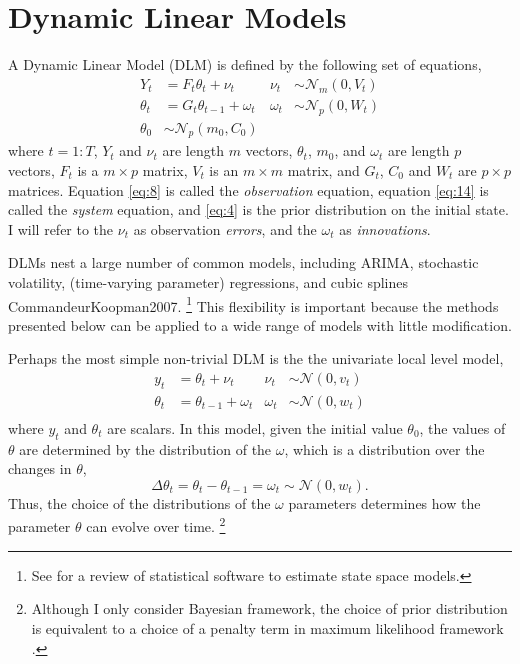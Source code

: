 \documentclass{article}
\newcommand{\paren}[1]{\ensuremath{\left(#1\right)}}
\newcommand{\dnorm}[1]{\ensuremath{\mathcal{N}\paren{#1}}}
\newcommand{\dmvnorm}[2]{\ensuremath{\mathcal{N}_{#2}\paren{#1}}}
\begin{document}
\section{Dynamic Linear Models}

A Dynamic Linear Model (DLM) is defined by the following set of equations,
\begin{align}
  \label{eq:8}
  Y_t &= F_{t} \theta_t + \nu_t & \nu_{t} &\sim \dmvnorm{0, V_{t}}{m} \\
  \label{eq:14}
  \theta_t &= G_{t} \theta_{t-1} + \omega_{t} & \omega_{t} &\sim \dmvnorm{0, W_{t}}{p} \\
  \label{eq:2}
  \theta_{0} & \sim \dmvnorm{m_{0}, C_{0}}{p}
\end{align}  
where $t = 1:T$, 
$Y_{t}$ and $\nu_{t}$ are length $m$ vectors,
$\theta_{t}$, $m_{0}$, and $\omega_{t}$ are length $p$ vectors,
$F_{t}$ is a $m \times p$ matrix, 
$V_{t}$ is an $m \times m$ matrix,
and $G_{t}$, $C_{0}$ and $W_{t}$ are $p \times p$ matrices.
Equation \eqref{eq:8} is called the \textit{observation} equation, 
equation \eqref{eq:14} is called the \textit{system} equation,
and \eqref{eq:4} is the prior distribution on the initial state.
I will refer to the $\nu_{t}$ as observation \textit{errors}, and the $\omega_{t}$ as \textit{innovations}.

DLMs nest a large number of common models, including ARIMA, stochastic volatility, (time-varying parameter) regressions,
and cubic splines \parencites{WestHarrison1997}{DurbinKoopman2001}\parencite{PetrisPetroneEtAl2009}{CommandeurKoopman2007}.%
\footnote{See \textcite{CommandeurKoopmanOoms2011} for a review of statistical software to estimate state space models.}
This flexibility is important because the methods presented below can be applied to a wide range of models with little modification.

Perhaps the most simple non-trivial DLM is the the univariate local level model,
\begin{align}
  \label{eq:15}
  y_t &= \theta_t + \nu_t & \nu_{t} &\sim \dnorm{0, v_{t}} \\
  \label{eq:16}
  \theta_t &= \theta_{t-1} + \omega_{t} & \omega_{t} &\sim \dnorm{0, w_{t}} \\
\end{align}
where $y_{t}$ and $\theta_{t}$ are scalars.
In this model, given the initial value $\theta_{0}$, the values of $\theta$ are determined by the distribution of the $\omega$, which is a distribution over the changes in $\theta$,
\begin{equation}
  \label{eq:12}
  \Delta \theta_{t} = \theta_{t} - \theta_{t - 1} = \omega_{t} \sim \dnorm{0, w_{t}} \text{.}
\end{equation}
Thus, the choice of the distributions of the $\omega$ parameters determines how the parameter $\theta$ can evolve over time.%
\footnote{Although I only consider Bayesian framework, the choice of prior distribution is equivalent to a choice of a penalty term in maximum likelihood framework \parencite{PolsonScott2010}.}
\end{document}
